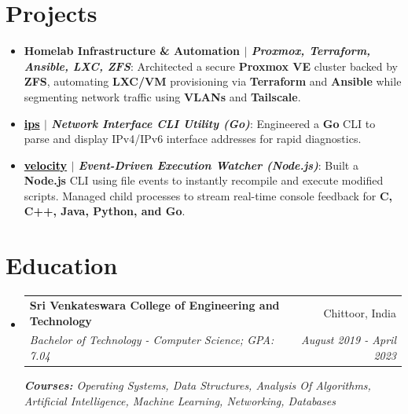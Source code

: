 \documentclass[a4paper,20pt]{article}
\makeatletter
\newcommand{\resumeItem}[2]{
  \item\small{
    \textbf{#1}{: #2 \vspace{-2pt}}
  }
}
\newcommand{\resumeSubheading}[4]{
  \vspace{-1pt}\item
    \begin{tabular*}{0.97\textwidth}{l@{\extracolsep{\fill}}r}
      \textbf{#1} & #2 \\
      \textit{#3} & \textit{#4} \\
    \end{tabular*}\vspace{-5pt}
}
\newcommand{\resumeSubItem}[2]{\resumeItem{#1}{#2}\vspace{-3pt}}
\newcommand{\resumeSubHeadingListStart}{\begin{itemize}[leftmargin=*]}
\newcommand{\resumeSubHeadingListEnd}{\end{itemize}}
\makeatother
\begin{document}
\section{Projects}
\resumeSubHeadingListStart
\resumeSubItem{Homelab Infrastructure \& Automation $|$ \emph{Proxmox, Terraform, Ansible, LXC, ZFS}}  {Architected a secure \textbf{Proxmox VE} cluster backed by \textbf{ZFS}, automating \textbf{LXC/VM} provisioning via \textbf{Terraform} and \textbf{Ansible} while segmenting network traffic using \textbf{VLANs} and \textbf{Tailscale}.}
\vspace{2pt}
\resumeSubItem{\href{https://www.github.com/afrid18/ips}{\textcolor{black}{\textbf{ips}}} $|$ \emph{Network Interface CLI Utility (Go)}}{Engineered a \textbf{Go} CLI to parse and display IPv4/IPv6 interface addresses for rapid diagnostics.}
\vspace{2pt}
\resumeSubItem{\href{https://www.github.com/afrid18/velocity}{\textcolor{black}{\textbf{velocity}}} $|$ \emph{Event-Driven Execution Watcher (Node.js)}}{Built a \textbf{Node.js} CLI using file events to instantly recompile and execute modified scripts. Managed child processes to stream real-time console feedback for \textbf{C, C++, Java, Python, and Go}.}
\resumeSubHeadingListEnd
\vspace{-5pt}

\section{Education}
\resumeSubHeadingListStart
\resumeSubheading
{Sri Venkateswara College of Engineering and Technology}{Chittoor, India}
{Bachelor of Technology - Computer Science;  GPA: 7.04}{August 2019 - April 2023}
{\scriptsize \textit{ \footnotesize{\newline{}\textbf{Courses:} Operating Systems, Data Structures, Analysis Of Algorithms, Artificial Intelligence, Machine Learning, Networking, Databases}}}
\resumeSubHeadingListEnd
\vspace{-5pt}
\end{document}
